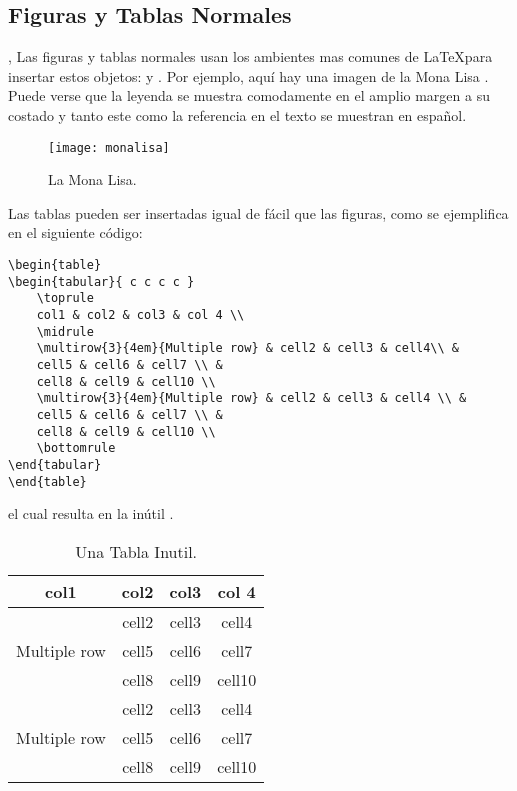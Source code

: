 \subsection{Figuras y Tablas Normales}
, 
Las figuras y tablas normales usan los ambientes mas comunes de \LaTeX para insertar estos objetos:  y . Por ejemplo, aquí hay una imagen de la Mona Lisa . Puede verse que la leyenda se muestra comodamente en el amplio margen a su costado y tanto este como la referencia en el texto se muestran en español.

\begin{figure}[hb]
	\texttt{[image: monalisa]}
	\caption[La Mona Lisa]{La Mona Lisa. \blindtext}
\end{figure}

Las tablas pueden ser insertadas igual de fácil que las figuras, como se ejemplifica en el siguiente código:

\begin{lstlisting}[caption={Leyenda de un Código.}]
\begin{table}
\begin{tabular}{ c c c c }
	\toprule
	col1 & col2 & col3 & col 4 \\
	\midrule
	\multirow{3}{4em}{Multiple row} & cell2 & cell3 & cell4\\ &
	cell5 & cell6 & cell7 \\ &
	cell8 & cell9 & cell10 \\
	\multirow{3}{4em}{Multiple row} & cell2 & cell3 & cell4 \\ &
	cell5 & cell6 & cell7 \\ &
	cell8 & cell9 & cell10 \\
	\bottomrule
\end{tabular}
\end{table}
\end{lstlisting}

el cual resulta en la inútil .

\begin{table}[h]
\caption[Una Tabla Inutil]{Una Tabla Inutil.}
\begin{tabular}{ c c c c }
	\toprule
	col1 & col2 & col3 & col 4 \\
	\midrule
	\multirow{3}{4em}{Multiple row} & cell2 & cell3 & cell4\\ &
	cell5 & cell6 & cell7 \\ &
	cell8 & cell9 & cell10 \\
	\multirow{3}{4em}{Multiple row} & cell2 & cell3 & cell4 \\ &
	cell5 & cell6 & cell7 \\ &
	cell8 & cell9 & cell10 \\
	\bottomrule
\end{tabular}
\end{table}

